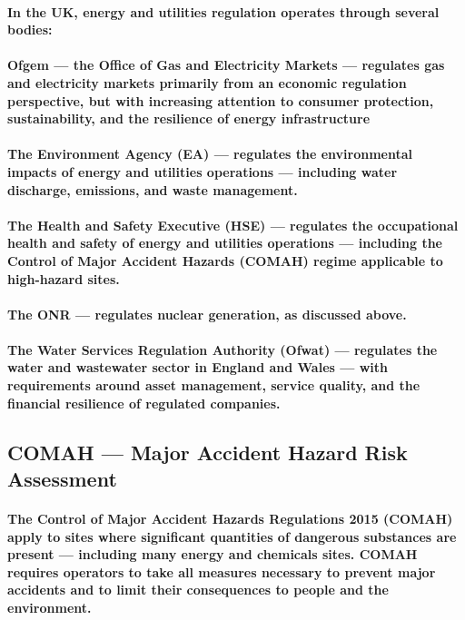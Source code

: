 \paragraph{In the UK, energy and utilities regulation operates through several bodies:}
\paragraph{\textbf{Ofgem} — the Office of Gas and Electricity Markets — regulates gas and electricity markets primarily from an economic regulation perspective, but with increasing attention to consumer protection, sustainability, and the resilience of energy infrastructure}
\paragraph{\textbf{The Environment Agency (EA)} — regulates the environmental impacts of energy and utilities operations — including water discharge, emissions, and waste management.}
\paragraph{\textbf{The Health and Safety Executive (HSE)} — regulates the occupational health and safety of energy and utilities operations — including the Control of Major Accident Hazards (COMAH) regime applicable to high-hazard sites.}
\paragraph{The \textbf{ONR} — regulates nuclear generation, as discussed above.}
\paragraph{The \textbf{Water Services Regulation Authority (Ofwat)} — regulates the water and wastewater sector in England and Wales — with requirements around asset management, service quality, and the financial resilience of regulated companies.}

\subsection{COMAH — Major Accident Hazard Risk Assessment}
\paragraph{The \textbf{Control of Major Accident Hazards Regulations 2015 (COMAH)} apply to sites where significant quantities of dangerous substances are present — including many energy and chemicals sites. COMAH requires operators to take all measures necessary to prevent major accidents and to limit their consequences to people and the environment.}
